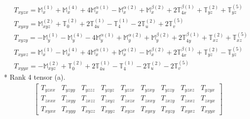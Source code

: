 \documentclass[fleqn,8pt,landscape]{jsarticle}
\begin{document}
\begin{align*}
& T_{xyzx} = \mathbb{M}_{x}^{(1)} + \mathbb{M}_{x}^{(4)} + 4 \mathbb{M}_{x}^{\alpha(1)} - \mathbb{M}_{x}^{\alpha(2)} + \mathbb{M}_{x}^{\beta(2)} + 2 \mathbb{T}_{4x}^{\beta(1)} + \mathbb{T}_{yz}^{(2)} + \mathbb{T}_{yz}^{(5)} \\
& T_{xyxy} = \mathbb{M}_{xyz}^{(2)} + \mathbb{T}_{0}^{(2)} + 2 \mathbb{T}_{4u}^{(1)} - \mathbb{T}_{4}^{(1)} - 2 \mathbb{T}_{u}^{(2)} + 2 \mathbb{T}_{v}^{(5)} \\
& T_{xyzy} = - \mathbb{M}_{y}^{(1)} - \mathbb{M}_{y}^{(4)} - 4 \mathbb{M}_{y}^{\alpha(1)} + \mathbb{M}_{y}^{\alpha(2)} + \mathbb{M}_{y}^{\beta(2)} + 2 \mathbb{T}_{4y}^{\beta(1)} + \mathbb{T}_{xz}^{(2)} + \mathbb{T}_{xz}^{(5)} \\
& T_{xyxz} = \mathbb{M}_{x}^{(1)} - \mathbb{M}_{x}^{(4)} + 4 \mathbb{M}_{x}^{\alpha(1)} + \mathbb{M}_{x}^{\alpha(2)} - \mathbb{M}_{x}^{\beta(2)} + 2 \mathbb{T}_{4x}^{\beta(1)} + \mathbb{T}_{yz}^{(2)} - \mathbb{T}_{yz}^{(5)} \\
& T_{xyyx} = - \mathbb{M}_{xyz}^{(2)} + \mathbb{T}_{0}^{(2)} + 2 \mathbb{T}_{4u}^{(1)} - \mathbb{T}_{4}^{(1)} - 2 \mathbb{T}_{u}^{(2)} - 2 \mathbb{T}_{v}^{(5)}
\end{align*}
* Rank 4 tensor (a).
\begin{align*}
\begin{bmatrix} T_{yzxx} & T_{yzyy} & T_{yzzz} & T_{yzyz} & T_{yzzx} & T_{yzxy} & T_{yzzy} & T_{yzxz} & T_{yzyx} \\ T_{zxxx} & T_{zxyy} & T_{zxzz} & T_{zxyz} & T_{zxzx} & T_{zxxy} & T_{zxzy} & T_{zxxz} & T_{zxyx} \\ T_{xyxx} & T_{xyyy} & T_{xyzz} & T_{xyyz} & T_{xyzx} & T_{xyxy} & T_{xyzy} & T_{xyxz} & T_{xyyx} \end{bmatrix}
\end{align*}
\end{document}

